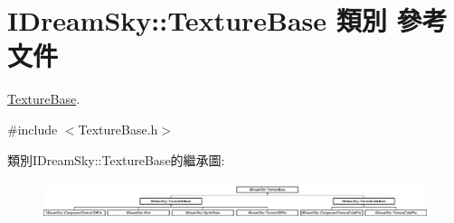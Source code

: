 \hypertarget{class_i_dream_sky_1_1_texture_base}{}\section{I\+Dream\+Sky\+:\+:Texture\+Base 類別 參考文件}
\label{class_i_dream_sky_1_1_texture_base}


\hyperlink{class_i_dream_sky_1_1_texture_base}{Texture\+Base}.  




{\ttfamily \#include $<$Texture\+Base.\+h$>$}

類別\+I\+Dream\+Sky\+:\+:Texture\+Base的繼承圖\+:\begin{figure}[H]
\begin{center}
\leavevmode
\includegraphics[height=1.120000cm]{class_i_dream_sky_1_1_texture_base}
\end{center}
\end{figure}

